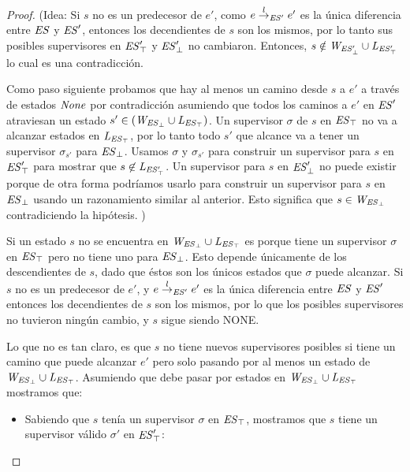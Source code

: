 \begin{proof}
	(Idea: Si $s$ no es un predecesor de $e'$, como $e \overset{l}{\rightarrow}_{\mathit{ES}'} e'$ es la única diferencia entre $\mathit{ES}$ y $\mathit{ES}'$, entonces los decendientes de $s$ son los mismos, 
	por lo tanto sus posibles supervisores en $\mathit{\mathit{ES}'_{\top}}$ y
	$\mathit{\mathit{ES}'_{\bot}}$ no cambiaron. Entonces, $s \notin \mathit{W_{\mathit{\mathit{ES}'_{\bot}}}} \cup 
	\mathit{L_{\mathit{\mathit{ES}'_{\top}}}}$ lo cual es una contradicción.
	
	Como paso siguiente probamos que hay al menos un camino desde $s$ a $e'$ a través de estados $\mathit{None}$ por contradicción asumiendo que todos los caminos a $e'$ en $\mathit{ES}'$ atraviesan un estado $s' \in 
	(\mathit{W_{\mathit{\mathit{ES}_{\bot}}}} \cup \mathit{L_{\mathit{\mathit{ES}_{\top}}}})$. Un supervisor $\sigma$ de $s$ en 
	$\mathit{\mathit{ES}_{\top}}$ no va a alcanzar estados en $\mathit{L_{\mathit{\mathit{ES}_{\top}}}}$, 
	por lo tanto todo $s'$ que alcance va a tener un supervisor $\sigma_{s'}$ para 
	$\mathit{\mathit{ES}_{\bot}}$. Usamos $\sigma$ y $\sigma_{s'}$ para construir un supervisor para $s$ en $\mathit{\mathit{ES}'_{\top}}$ para mostrar que $s 
	\not\in \mathit{L_{\mathit{\mathit{ES}'_{\top}}}}$.
	Un supervisor para $s$ en $\mathit{\mathit{ES}'_{\bot}}$ no puede existir porque de otra forma podríamos usarlo para construir un supervisor para $s$ en 
	$\mathit{\mathit{ES}_{\bot}}$ usando un razonamiento similar al anterior. Esto significa que $s \in 
	\mathit{W_{\mathit{\mathit{ES}_{\bot}}}}$ contradiciendo la hipótesis. )


Si un estado $s$ no se encuentra en $\mathit{W_{\mathit{\mathit{ES}_{\bot}}}} \cup \mathit{L_{\mathit{\mathit{ES}_{\top}}}}$ es porque tiene un supervisor $\sigma$ en $\mathit{\mathit{ES}_{\top}}$ pero no tiene uno para $\mathit{\mathit{ES}_{\bot}}$. Esto depende únicamente de los descendientes de $s$, dado que éstos son los únicos estados que $\sigma$ puede alcanzar. Si $s$ no es un predecesor de $e'$, y $e \overset{l}{\rightarrow}_{\mathit{ES}'} e'$ es la única diferencia entre $\mathit{ES}$ y $\mathit{ES}'$ entonces los decendientes de $s$ son los mismos, por lo que los posibles supervisores no tuvieron ningún cambio, y $s$ sigue siendo NONE.

Lo que no es tan claro, es que $s$ no tiene nuevos supervisores posibles si tiene un camino que puede alcanzar $e'$ pero solo pasando por al menos un estado de $\mathit{W_{\mathit{\mathit{ES}_{\bot}}}} \cup \mathit{L_{\mathit{\mathit{ES}_{\top}}}}$. Asumiendo que debe pasar por estados en $\mathit{W_{\mathit{\mathit{ES}_{\bot}}}} \cup \mathit{L_{\mathit{\mathit{ES}_{\top}}}}$ mostramos que:

\begin{itemize}
	\item Sabiendo que $s$ tenía un supervisor $\sigma$ en $\mathit{\mathit{ES}_{\top}}$, mostramos que $s$ tiene un supervisor válido $\sigma'$ en $\mathit{\mathit{ES}'_{\top}}$:
	

\end{itemize}
\end{proof}
